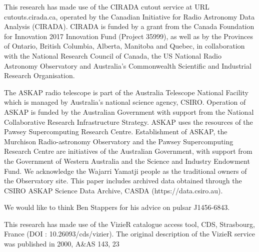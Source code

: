 \documentclass[12pt]{article}
\begin{document}
This research has made use of the CIRADA cutout service at URL cutouts.cirada.ca, operated by the Canadian Initiative for Radio Astronomy Data Analysis (CIRADA). CIRADA is funded by a grant from the Canada Foundation for Innovation 2017 Innovation Fund (Project 35999), as well as by the Provinces of Ontario, British Columbia, Alberta, Manitoba and Quebec, in collaboration with the National Research Council of Canada, the US National Radio Astronomy Observatory and Australia’s Commonwealth Scientific and Industrial Research Organisation.

The ASKAP radio telescope is part of the Australia Telescope National Facility which is managed by Australia’s national science agency, CSIRO. Operation of ASKAP is funded by the Australian Government with support from the National Collaborative Research Infrastructure Strategy. ASKAP uses the resources of the Pawsey Supercomputing Research Centre. Establishment of ASKAP, the Murchison Radio-astronomy Observatory and the Pawsey Supercomputing Research Centre are initiatives of the Australian Government, with support from the Government of Western Australia and the Science and Industry Endowment Fund. We acknowledge the Wajarri Yamatji people as the traditional owners of the Observatory site. This paper includes archived data obtained through the CSIRO ASKAP Science Data Archive, CASDA (https://data.csiro.au).

We would like to think Ben Stappers for his advice on pulsar J1456-6843.

This research has made use of the VizieR catalogue access tool, CDS,
Strasbourg, France (DOI : 10.26093/cds/vizier). The original description 
of the VizieR service was published in 2000, A\&AS 143, 23
\end{document}
